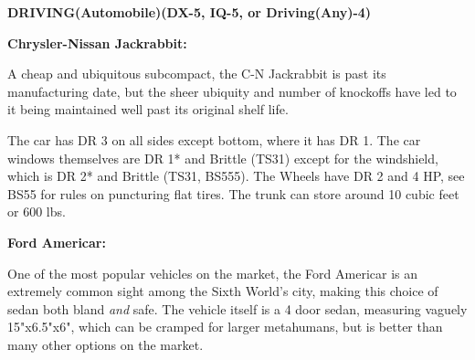 \textbf{DRIVING(Automobile)(DX-5, IQ-5, or Driving(Any)-4)}
\begin{center} 
	\begin{adjustwidth}{-9.5mm}{}
	\end{adjustwidth}
\end{center}


\textbf{Chrysler-Nissan Jackrabbit:}

 A cheap and ubiquitous subcompact, the C-N Jackrabbit is past its manufacturing date, but the sheer ubiquity and number of knockoffs have led to it being maintained well past its original shelf life.
 
 The car has DR 3 on all sides except bottom, where it has DR 1. The car windows themselves are DR 1* and Brittle (TS31) except for the windshield, which is DR 2* and Brittle (TS31, BS555). The Wheels have DR 2 and 4 HP, see BS55 for rules on puncturing flat tires. The trunk can store around 10 cubic feet or 600 lbs.

\textbf{Ford Americar:} 

One of the most popular vehicles on the market, the Ford Americar is an extremely common sight among the Sixth World's city, making this choice of sedan both bland \textit{and} safe. The vehicle itself is a 4 door sedan, measuring vaguely 15"x6.5"x6", which can be cramped for larger metahumans, but is better than many other options on the market.


